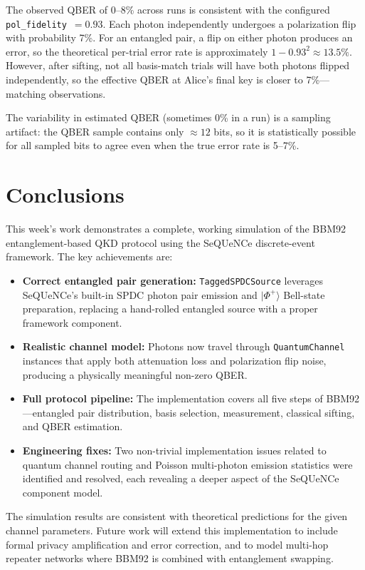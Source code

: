 \documentclass[12pt,oneside,letterpaper,english]{article}
\begin{document}
The observed QBER of 0--8\% across runs is consistent with the configured \texttt{pol\_fidelity}~$= 0.93$. Each photon independently undergoes a polarization flip with probability 7\%. For an entangled pair, a flip on either photon produces an error, so the theoretical per-trial error rate is approximately $1 - 0.93^2 \approx 13.5\%$. However, after sifting, not all basis-match trials will have both photons flipped independently, so the effective QBER at Alice's final key is closer to 7\%---matching observations.

The variability in estimated QBER (sometimes 0\% in a run) is a sampling artifact: the QBER sample contains only $\approx 12$ bits, so it is statistically possible for all sampled bits to agree even when the true error rate is 5--7\%.

\section{Conclusions}

This week's work demonstrates a complete, working simulation of the BBM92 entanglement-based QKD protocol using the SeQUeNCe discrete-event framework. The key achievements are:

\begin{itemize}
    \item \textbf{Correct entangled pair generation:} \texttt{TaggedSPDCSource} leverages SeQUeNCe's built-in SPDC photon pair emission and $|\Phi^+\rangle$ Bell-state preparation, replacing a hand-rolled entangled source with a proper framework component.
    \item \textbf{Realistic channel model:} Photons now travel through \texttt{QuantumChannel} instances that apply both attenuation loss and polarization flip noise, producing a physically meaningful non-zero QBER.
    \item \textbf{Full protocol pipeline:} The implementation covers all five steps of BBM92---entangled pair distribution, basis selection, measurement, classical sifting, and QBER estimation.
    \item \textbf{Engineering fixes:} Two non-trivial implementation issues related to quantum channel routing and Poisson multi-photon emission statistics were identified and resolved, each revealing a deeper aspect of the SeQUeNCe component model.
\end{itemize}

The simulation results are consistent with theoretical predictions for the given channel parameters. Future work will extend this implementation to include formal privacy amplification and error correction, and to model multi-hop repeater networks where BBM92 is combined with entanglement swapping.
\end{document}

